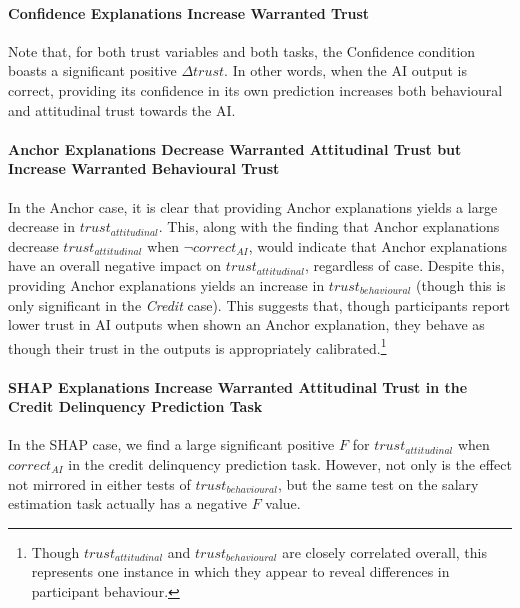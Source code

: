 \paragraph{Confidence Explanations Increase Warranted Trust}
Note that, for both trust variables and both tasks, the Confidence condition boasts a significant positive $\Delta trust$. In other words, when the AI output is correct, providing its confidence in its own prediction increases both behavioural and attitudinal trust towards the AI.

\paragraph{Anchor Explanations Decrease Warranted Attitudinal Trust but Increase Warranted Behavioural Trust}
In the Anchor case, it is clear that providing Anchor explanations yields a large decrease in $trust_{attitudinal}$. This, along with the finding that Anchor explanations decrease $trust_{attitudinal}$ when $\neg correct_{AI}$, would indicate that Anchor explanations have an overall negative impact on $trust_{attitudinal}$, regardless of case. Despite this, providing Anchor explanations yields an increase in $trust_{behavioural}$ (though this is only significant in the \emph{Credit} case). This suggests that, though participants report lower trust in AI outputs when shown an Anchor explanation, they behave as though their trust in the outputs is appropriately calibrated.\footnote{Though $trust_{attitudinal}$ and $trust_{behavioural}$ are closely correlated overall, this represents one instance in which they appear to reveal differences in participant behaviour.}

\paragraph{SHAP Explanations Increase Warranted Attitudinal Trust in the Credit Delinquency Prediction Task}
In the SHAP case, we find a large significant positive $F$ for $trust_{attitudinal}$ when $correct_{AI}$ in the credit delinquency prediction task. However, not only is the effect not mirrored in either tests of $trust_{behavioural}$, but the same test on the salary estimation task actually has a negative $F$ value.

